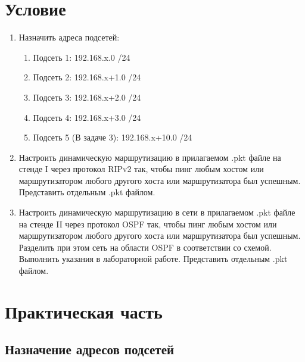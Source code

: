 \chapter{Условие}%
\label{cha:uslovie}

\begin{enumerate}
    \item 
        Назначить адреса подсетей:
        \begin{enumerate}
            \item 
                Подсеть 1: 192.168.x.0 /24
            \item 
                Подсеть 2: 192.168.x+1.0 /24
            \item 
                Подсеть 3: 192.168.x+2.0 /24
            \item 
                Подсеть 4: 192.168.x+3.0 /24
            \item 
                Подсеть 5 (В задаче 3): 192.168.x+10.0 /24
        \end{enumerate}

    \item 
        Настроить динамическую маршрутизацию в прилагаемом .pkt файле на стенде I через протокол RIPv2 так, чтобы пинг любым хостом или маршрутизатором любого другого хоста или маршрутизатора был успешным. Представить отдельным .pkt файлом.

    \item 
        Настроить динамическую маршрутизацию в сети в прилагаемом .pkt файле на стенде II через протокол OSPF так, чтобы пинг любым хостом или маршрутизатором любого другого хоста или маршрутизатора был успешным. Разделить при этом сеть на области OSPF в соответствии со схемой. Выполнить указания в лабораторной работе. Представить отдельным .pkt файлом.
\end{enumerate}

\chapter{Практическая часть}%
\label{cha:prakticheskaia_chast_}

\section{Назначение адресов подсетей}%

